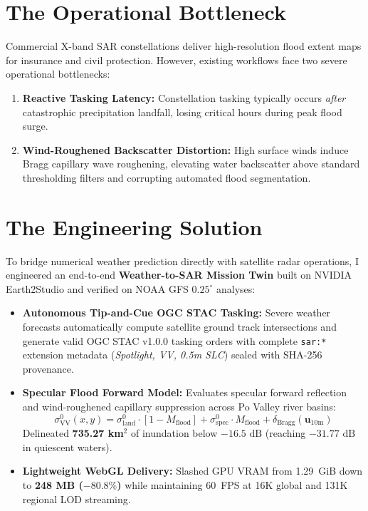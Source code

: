 \documentclass[9pt,letterpaper]{article}
\begin{document}
\noindent
\begin{minipage}[t]{0.51\textwidth}
    \section*{The Operational Bottleneck}
    \footnotesize
    Commercial X-band SAR constellations deliver high-resolution flood extent maps for insurance and civil protection. However, existing workflows face two severe operational bottlenecks:
    \begin{enumerate}[leftmargin=12pt,topsep=1pt,itemsep=1pt,parsep=0pt]
        \item \textbf{Reactive Tasking Latency:} Constellation tasking typically occurs \textit{after} catastrophic precipitation landfall, losing critical hours during peak flood surge.
        \item \textbf{Wind-Roughened Backscatter Distortion:} High surface winds induce Bragg capillary wave roughening, elevating water backscatter above standard thresholding filters and corrupting automated flood segmentation.
    \end{enumerate}

    \section*{The Engineering Solution}
    \footnotesize
    To bridge numerical weather prediction directly with satellite radar operations, I engineered an end-to-end \textbf{Weather-to-SAR Mission Twin} built on NVIDIA Earth2Studio and verified on NOAA GFS $0.25^\circ$ analyses:
    \begin{itemize}[leftmargin=12pt,topsep=1pt,itemsep=1pt,parsep=0pt]
        \item \textbf{Autonomous Tip-and-Cue OGC STAC Tasking:} Severe weather forecasts automatically compute satellite ground track intersections and generate valid OGC STAC v1.0.0 tasking orders with complete \texttt{sar:*} extension metadata (\textit{Spotlight, VV, 0.5m SLC}) sealed with SHA-256 provenance.
        \item \textbf{Specular Flood Forward Model:} Evaluates specular forward reflection and wind-roughened capillary suppression across Po Valley river basins:
        \begin{equation*}
            \sigma^0_{\text{VV}}(x,y) = \sigma^0_{\text{land}} \cdot [1 - M_{\text{flood}}] + \sigma^0_{\text{spec}} \cdot M_{\text{flood}} + \delta_{\text{Bragg}}(\bm{u}_{10\text{m}})
        \end{equation*}
        Delineated \textbf{735.27 km$^2$} of inundation below $-16.5\text{ dB}$ (reaching $-31.77\text{ dB}$ in quiescent waters).
        \item \textbf{Lightweight WebGL Delivery:} Slashed GPU VRAM from 1.29~GiB down to \textbf{248 MB ($-80.8\%$)} while maintaining 60~FPS at 16K global and 131K regional LOD streaming.
    \end{itemize}


\end{minipage}
\end{document}

